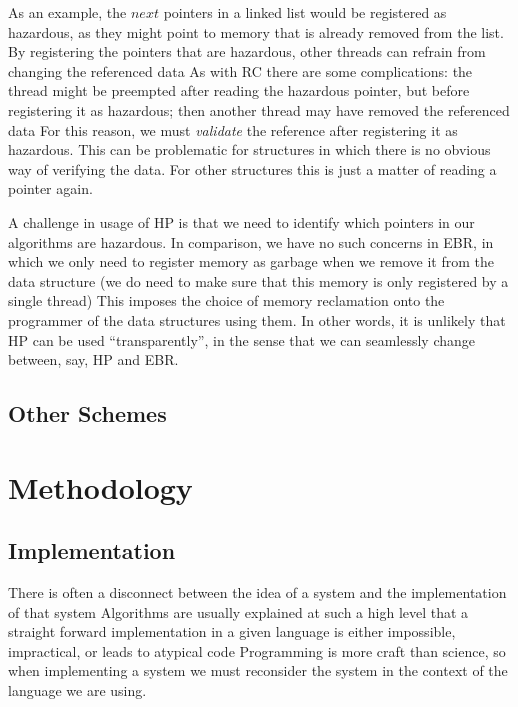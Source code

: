 \documentclass[b5paper]{report}
\begin{document}
As an example, the $next$ pointers in a linked list would be registered as
hazardous, as they might point to memory that is already removed from the list.
By registering the pointers that are hazardous, other threads can refrain from
changing the referenced data As with RC there are some complications: the
thread might be preempted after reading the hazardous pointer, but before
registering it as hazardous; then another thread may have removed the referenced
data For this reason, we must \emph{validate} the reference after registering
it as hazardous. This can be problematic for structures in which there is no
obvious way of verifying the data. For other structures this is just a matter of
reading a pointer again.

A challenge in usage of HP is that we need to identify which pointers in our
algorithms are hazardous. In comparison, we have no such concerns in EBR, in
which we only need to register memory as garbage when we remove it from the data
structure (we do need to make sure that this memory is only registered by a
single thread) This imposes the choice of memory reclamation onto the
programmer of the data structures using them. In other words, it is unlikely
that HP can be used ``transparently'', in the sense that we can seamlessly
change between, say, HP and EBR\@.


\section{Other Schemes}


\chapter{Methodology}

\section{Implementation}
There is often a disconnect between the idea of a system and the implementation
of that system Algorithms are usually explained at such a high level that a
straight forward implementation in a given language is either impossible,
impractical, or leads to atypical code Programming is more craft than
science, so when implementing a system we must reconsider the system in the
context of the language we are using.
\end{document}
